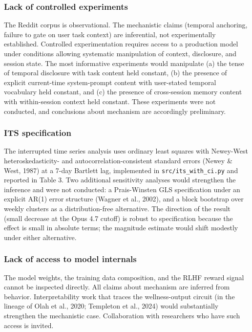 \documentclass[11pt]{article}
\begin{document}
\subsubsection{Lack of controlled experiments}

The Reddit corpus is observational. The mechanistic claims (temporal anchoring, failure to gate on user task context) are inferential, not experimentally established. Controlled experimentation requires access to a production model under conditions allowing systematic manipulation of context, disclosure, and session state. The most informative experiments would manipulate (a) the tense of temporal disclosure with task content held constant, (b) the presence of explicit current-time system-prompt content with user-stated temporal vocabulary held constant, and (c) the presence of cross-session memory content with within-session context held constant. These experiments were not conducted, and conclusions about mechanism are accordingly preliminary.

\subsubsection{ITS specification}

The interrupted time series analysis uses ordinary least squares with Newey-West heteroskedasticity- and autocorrelation-consistent standard errors (Newey \& West, 1987) at a 7-day Bartlett lag, implemented in \texttt{src/its\_with\_ci.py} and reported in Table 3. Two additional sensitivity analyses would strengthen the inference and were not conducted: a Prais-Winsten GLS specification under an explicit AR(1) error structure (Wagner et al., 2002), and a block bootstrap over weekly clusters as a distribution-free alternative. The direction of the result (small decrease at the Opus 4.7 cutoff) is robust to specification because the effect is small in absolute terms; the magnitude estimate would shift modestly under either alternative.

\subsubsection{Lack of access to model internals}

The model weights, the training data composition, and the RLHF reward signal cannot be inspected directly. All claims about mechanism are inferred from behavior. Interpretability work that traces the wellness-output circuit (in the lineage of Olah et al., 2020; Templeton et al., 2024) would substantially strengthen the mechanistic case. Collaboration with researchers who have such access is invited.
\end{document}

